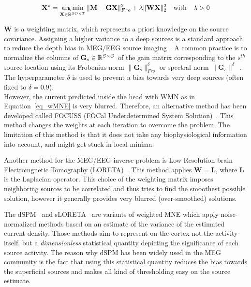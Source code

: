 \begin{equation}\label{eq_wMNE}
\mathbf{X}^\star = \mathop{\mathrm{arg}\,\mathrm{min}}_{\mathbf{X}\in\mathbb{R}^{SO\times T}} \|\mathbf{M}-\mathbf{GX}\|_{Fro}^2 + \lambda\|\mathbf{WX}\|_2^2 \hspace{10pt} \mathrm{with} \hspace{10pt} \lambda > 0
\end{equation}

$\mathbf{W}$ is a weighting matrix, which represents a priori knowledge on the source covariance. Assigning a higher variance to a deep sources is a standard approach to reduce the depth bias in MEG/EEG source imaging~\cite{lin2006assessing, Gramfort_Strohmeier_Haueisen_Hamalainen_Kowalski13,haufe2008combining, haufe2011large,huang2014meg,palmero2007swloreta}. A common practice is to normalize the columns of $\mathbf{G}_s\in\mathbb{R}^{S\times O}$ of the gain matrix corresponding to the $s^{th}$ source location using its Frobenius norm $\|\mathbf{G}_s\|^\delta_{Fro}$ or spectral norm $\|\mathbf{G}_s\|^\delta$~\cite{gramfort2014mne,Gramfort_Strohmeier_Haueisen_Hamalainen_Kowalski13, kohler2006depth}. The hyperparameter $\delta$ is used to prevent a bias towards very deep sources (often fixed to $\delta=0.9$).\\

However, the current predicted inside the head with WMN as in Equation~\eqref{eq_wMNE} is very blurred. Therefore, an alternative method has been developed called FOCUSS (FOCal Underdetermined System Solution)~\cite{gorodnitsky1995neuromagnetic}. This method changes the weights at each iteration to overcome the problem. The limitation of this method is that it does not take any biophysiological information into account, and might get stuck in local minima.

Another method for the MEG/EEG inverse problem is Low Resolution brain Electromgnetic Tomography (LORETA)~\cite{pascual1994low}. This method applies $\mathbf{W}=\mathbf{L}$, where $\mathbf{L}$ is the Laplacian operator. This choice of the weighting matrix imposes neighboring sources to be correlated and thus tries to find the smoothest possible solution, however it generally provides very blurred (over-smoothed) solutions.

The dSPM~\cite{dale2000dynamic} and sLORETA~\cite{pascual2002standardized} are variants of weighted MNE which apply noise-normalized methods based on an estimate of the variance of the estimated current density. Those methods aim to represent on the cortex not the activity itself, but a \textit{dimensionless} statistical quantity depicting the significance of each source activity. The reason why dSPM has been widely used in the MEG community is the fact that using this statistical quantity reduces the bias towards the superficial sources and makes all kind of thresholding easy on the source estimate.

